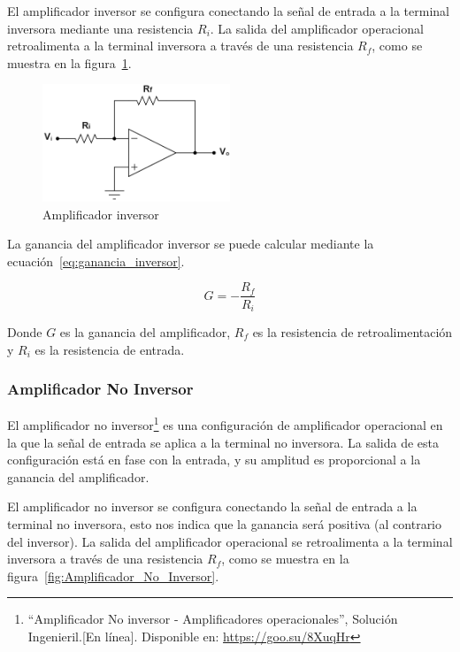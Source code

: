             El amplificador inversor se configura conectando la señal de entrada a la terminal inversora mediante una resistencia $R_i$. La salida del amplificador operacional retroalimenta a la terminal inversora a través de una resistencia $R_f$, como se muestra en la figura~\ref{fig:Amplificador_Inversor}.
            
            \begin{figure}[H]
                \centering
                \includegraphics[width=0.5\textwidth]{img/Marco/Amplificador_Inversor.png}
                \caption[Amplificador inversor]{Amplificador inversor\footnotemark}
                \label{fig:Amplificador_Inversor}
            \end{figure}

            La ganancia del amplificador inversor se puede calcular mediante la ecuación~\ref{eq:ganancia_inversor}.

            \begin{equation}
                \label{eq:ganancia_inversor}
                G = -\frac{R_f}{R_i}
            \end{equation}

            Donde $G$ es la ganancia del amplificador, $R_f$ es la resistencia de retroalimentación y $R_i$ es la resistencia de entrada.

        \subsubsection{Amplificador No Inversor}
            El amplificador no inversor\footnote{``Amplificador No inversor - Amplificadores operacionales'', Solución Ingenieril.[En línea]. Disponible en: \url{https://goo.su/8XuqHr}} es una configuración de amplificador operacional en la que la señal de entrada se aplica a la terminal no inversora. La salida de esta configuración está en fase con la entrada, y su amplitud es proporcional a la ganancia del amplificador.

            El amplificador no inversor se configura conectando la señal de entrada a la terminal no inversora, esto nos indica que la ganancia será positiva (al contrario del inversor). La salida del amplificador operacional se retroalimenta a la terminal inversora a través de una resistencia $R_f$, como se muestra en la figura~\ref{fig:Amplificador_No_Inversor}.

